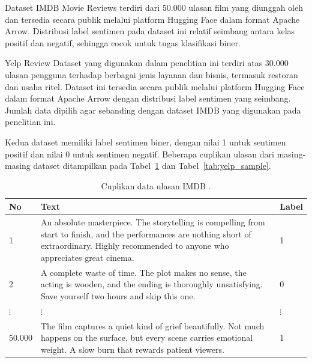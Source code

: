Dataset IMDB Movie Reviews terdiri dari 50.000 ulasan film yang diunggah oleh
\parencite{maas2011} dan tersedia secara publik melalui platform Hugging Face
dalam format Apache Arrow. Distribusi label sentimen pada dataset ini relatif
seimbang antara kelas positif dan negatif, sehingga cocok untuk tugas
klasifikasi biner.

Yelp Review Dataset yang digunakan dalam penelitian ini terdiri atas 30.000
ulasan pengguna terhadap berbagai jenis layanan dan bisnis, termasuk
restoran dan usaha ritel. Dataset ini tersedia secara publik melalui
platform Hugging Face \parencite{zhang2015} dalam format Apache Arrow dengan
distribusi label sentimen yang seimbang. Jumlah data dipilih agar sebanding
dengan dataset IMDB yang digunakan pada penelitian ini.

Kedua dataset memiliki label sentimen biner, dengan nilai 1 untuk sentimen
positif dan nilai 0 untuk sentimen negatif. Beberapa cuplikan ulasan dari
masing-masing dataset ditampilkan pada Tabel~\ref{tab:IMDB_sample} dan
Tabel~\ref{tab:yelp_sample}.

\begin{table}[H]
    \centering
    \caption{Cuplikan data ulasan IMDB \parencite{maas2011}.}
    \label{tab:IMDB_sample}
    \begin{tabular}{p{} p{} p{}}
        \hline
        \textbf{No} & \textbf{Text} & \textbf{Label} \\
        \hline
        1 &
        An absolute masterpiece. The storytelling is compelling from start
        to finish, and the performances are nothing short of extraordinary.
        Highly recommended to anyone who appreciates great cinema. & 1 \\
        \hline
        2 &
        A complete waste of time. The plot makes no sense, the acting is
        wooden, and the ending is thoroughly unsatisfying. Save yourself
        two hours and skip this one. & 0 \\
        \hline
        $\vdots$ & $\vdots$ & $\vdots$ \\
        \hline
        50.000 &
        The film captures a quiet kind of grief beautifully. Not much
        happens on the surface, but every scene carries emotional weight.
        A slow burn that rewards patient viewers. & 1 \\
        \hline
    \end{tabular}
\end{table}

